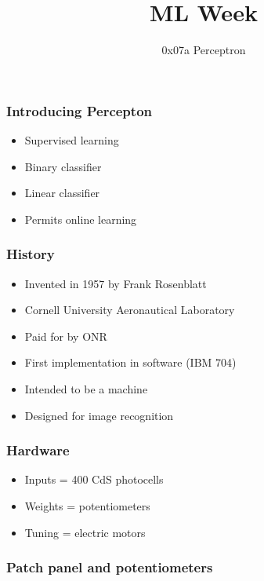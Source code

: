 
\title
{ML Week}
\subtitle{0x07a \hspace{2mm}  Perceptron}




\begin{frame}
  \titlepage
\end{frame}


\begin{frame}
  \frametitle{Introducing Percepton}
  \begin{itemize}
  \item Supervised learning
  \item Binary classifier
  \item Linear classifier
  \item Permits online learning
  \end{itemize}
\end{frame}

\begin{frame}
  \frametitle{History}
  \begin{itemize}
  \item Invented in 1957 by Frank Rosenblatt
  \item Cornell University Aeronautical Laboratory
  \item Paid for by ONR
  \item First implementation in software (IBM 704)
  \item Intended to be a machine
  \item Designed for image recognition
  \end{itemize}
\end{frame}

\begin{frame}
  \frametitle{Hardware}
  \begin{itemize}
  \item Inputs = 400 CdS photocells
  \item Weights = potentiometers
  \item Tuning = electric motors
  \end{itemize}
\end{frame}

\begin{frame}
  \frametitle{Patch panel and potentiometers}
\end{frame}

